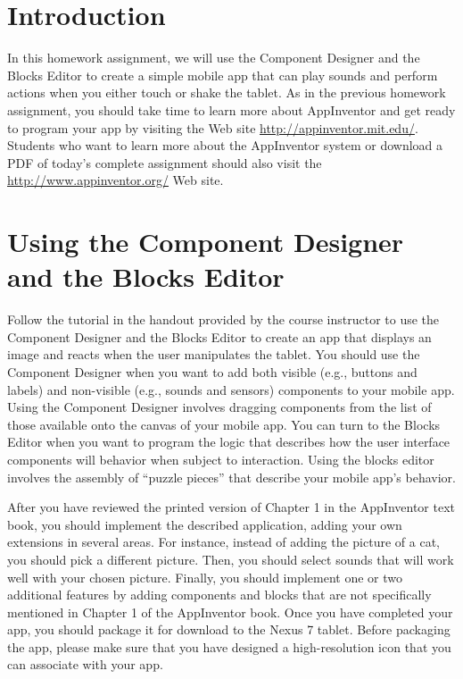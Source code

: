 	

\usepackage[compact]{titlesec}



\vspace*{-.1in}
\section*{Introduction}

In this homework assignment, we will use the Component Designer and the Blocks Editor to create a simple mobile app that
can play sounds and perform actions when you either touch or shake the tablet.  As in the previous homework assignment,
you should take time to learn more about AppInventor and get ready to program your app by visiting the Web site
\url{http://appinventor.mit.edu/}. Students who want to learn more about the AppInventor system or download a PDF of
today's complete assignment should also visit the \url{http://www.appinventor.org/} Web site.

\section*{Using the Component Designer and the Blocks Editor}

Follow the tutorial in the handout provided by the course instructor to use the Component Designer and the Blocks Editor
to create an app that displays an image and reacts when the user manipulates the tablet.  You should use the Component
Designer when you want to add both visible (e.g., buttons and labels) and non-visible (e.g., sounds and sensors)
components to your mobile app.  Using the Component Designer involves dragging components from the list of those
available onto the canvas of your mobile app.  You can turn to the Blocks Editor when you want to program the logic that
describes how the user interface components will behavior when subject to interaction. Using the blocks editor involves
the assembly of ``puzzle pieces'' that describe your mobile app's behavior.

After you have reviewed the printed version of Chapter 1 in the AppInventor text book, you should implement the
described application, adding your own extensions in several areas.  For instance, instead of adding the picture of a
cat, you should pick a different picture.  Then, you should select sounds that will work well with your chosen picture.
Finally, you should implement one or two additional features by adding components and blocks that are not specifically
mentioned in Chapter 1 of the AppInventor book. Once you have completed your app, you should package it for download to
the Nexus 7 tablet.  Before packaging the app, please make sure that you have designed a high-resolution icon that you
can associate with your app.


